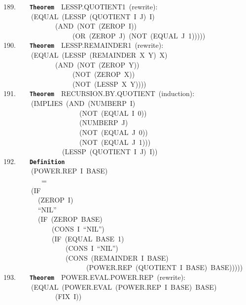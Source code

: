 \documentclass[11pt]{book}
\newenvironment{pubasis}{\begin{flushleft}\ttfamily\small}{\normalsize\rmfamily\end{flushleft}}
\newcommand{\axiomordefinition}[1]{\vspace{6pt}\texttt{\textbf{#1}}}
\begin{document}
\begin{pubasis}
189.~~~~\axiomordefinition{Theorem}~~LESSP.QUOTIENT1~(rewrite):\\
~~~~~~~~(EQUAL~(LESSP~(QUOTIENT~I~J)~I)\\
~~~~~~~~~~~~~~~(AND~(NOT~(ZEROP~I))\\
~~~~~~~~~~~~~~~~~~~~(OR~(ZEROP~J)~(NOT~(EQUAL~J~1)))))\\

190.~~~~\axiomordefinition{Theorem}~~LESSP.REMAINDER1~(rewrite):\\
~~~~~~~~(EQUAL~(LESSP~(REMAINDER~X~Y)~X)\\
~~~~~~~~~~~~~~~(AND~(NOT~(ZEROP~Y))\\
~~~~~~~~~~~~~~~~~~~~(NOT~(ZEROP~X))\\
~~~~~~~~~~~~~~~~~~~~(NOT~(LESSP~X~Y))))\\

191.~~~~\axiomordefinition{Theorem}~~RECURSION.BY.QUOTIENT~(induction):\\
~~~~~~~~(IMPLIES~(AND~(NUMBERP~I)\\
~~~~~~~~~~~~~~~~~~~~~~(NOT~(EQUAL~I~0))\\
~~~~~~~~~~~~~~~~~~~~~~(NUMBERP~J)\\
~~~~~~~~~~~~~~~~~~~~~~(NOT~(EQUAL~J~0))\\
~~~~~~~~~~~~~~~~~~~~~~(NOT~(EQUAL~J~1)))\\
~~~~~~~~~~~~~~~~~(LESSP~(QUOTIENT~I~J)~I))\\

192.~~~~\axiomordefinition{Definition}\\
~~~~~~~~(POWER.REP~I~BASE)\\
~~~~~~~~~~~=\\
~~~~~~~~(IF\\
~~~~~~~~~~(ZEROP~I)\\
~~~~~~~~~~``NIL''\\
~~~~~~~~~~(IF~(ZEROP~BASE)\\
~~~~~~~~~~~~~~(CONS~I~``NIL'')\\
~~~~~~~~~~~~~~(IF~(EQUAL~BASE~1)\\
~~~~~~~~~~~~~~~~~~(CONS~I~``NIL'')\\
~~~~~~~~~~~~~~~~~~(CONS~(REMAINDER~I~BASE)\\
~~~~~~~~~~~~~~~~~~~~~~~~(POWER.REP~(QUOTIENT~I~BASE)~BASE)))))\\

193.~~~~\axiomordefinition{Theorem}~~POWER.EVAL.POWER.REP~(rewrite):\\
~~~~~~~~(EQUAL~(POWER.EVAL~(POWER.REP~I~BASE)~BASE)\\
~~~~~~~~~~~~~~~(FIX~I))\\


\end{pubasis}
\end{document}
